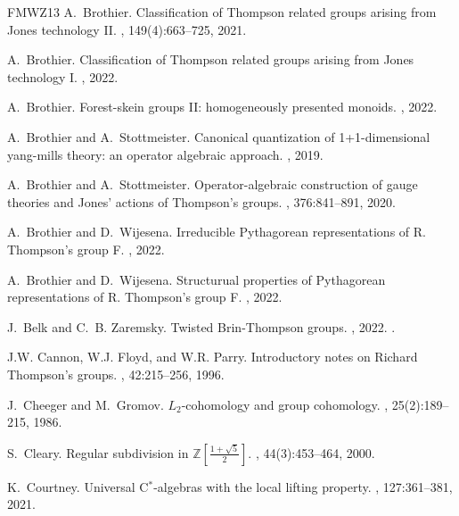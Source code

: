 \documentclass[a4paper, 12pt]{amsart}
\numberwithin{equation}{section}
\theoremstyle{definition}
\begin{document}
\begin{thebibliography}{FMWZ13}
A.~Brothier.
\newblock Classification of {T}hompson related groups arising from {J}ones
  technology {II}.
, 149(4):663--725, 2021.

A.~Brothier.
\newblock Classification of {T}hompson related groups arising from {J}ones
  technology {I}.
, 2022.

A.~Brothier.
\newblock Forest-skein groups {II}: homogeneously presented monoids.
, 2022.

A.~Brothier and A.~Stottmeister.
\newblock Canonical quantization of 1+1-dimensional yang-mills theory: an
  operator algebraic approach.
, 2019.

A.~Brothier and A.~Stottmeister.
\newblock Operator-algebraic construction of gauge theories and {J}ones'
  actions of {T}hompson's groups.
, 376:841--891, 2020.

A.~Brothier and D.~Wijesena.
\newblock Irreducible {P}ythagorean representations of {R}. {T}hompson's group
  {F}.
, 2022.

A.~Brothier and D.~Wijesena.
\newblock Structurual properties of {P}ythagorean representations of {R}.
  {T}hompson's group {F}.
, 2022.

J.~Belk and C.~B. Zaremsky.
\newblock Twisted {B}rin-{T}hompson groups.
, 2022.
.

J.W. Cannon, W.J. Floyd, and W.R. Parry.
\newblock Introductory notes on {R}ichard {T}hompson's groups.
, 42:215--256, 1996.

J.~Cheeger and M.~Gromov.
\newblock $L_2$-cohomology and group cohomology.
, 25(2):189--215, 1986.

S.~Cleary.
\newblock Regular subdivision in $\mathbb{Z}[\frac{1+\sqrt{5}}{2}]$.
, 44(3):453--464, 2000.

K.~Courtney.
\newblock Universal {C}$^*$-algebras with the local lifting property.
, 127:361--381, 2021.


\end{thebibliography}
\end{document}
